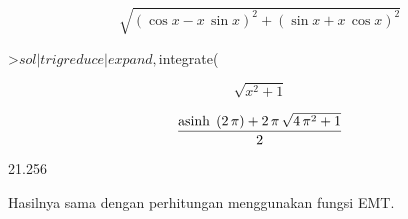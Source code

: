 \documentclass[a4paper,10pt]{article}
\begin{document}
\begin{eulernotebook}
\begin{eulercomment}
\begin{eulercomment}
\begin{eulercomment}
\begin{eulercomment}
\begin{eulercomment}
\begin{eulercomment}
\begin{eulercomment}
\begin{eulercomment}
\begin{eulercomment}
\begin{eulercomment}
\begin{eulercomment}
\begin{eulercomment}
\begin{eulercomment}
\begin{eulercomment}
\begin{euleroutput}
\end{euleroutput}
\begin{eulerformula}
\[
\sqrt{\left(\cos x-x\,\sin x\right)^2+\left(\sin x+x\,\cos x\right)
 ^2}
\]
\end{eulerformula}
\begin{eulerprompt}
>$sol | trigreduce | expand, $integrate(%
\end{eulerprompt}
\begin{eulerformula}
\[
\sqrt{x^2+1}
\]
\end{eulerformula}
\begin{eulerformula}
\[
\frac{{\rm asinh}\; \left(2\,\pi\right)+2\,\pi\,\sqrt{4\,\pi^2+1}}{
 2}
\]
\end{eulerformula}
\begin{euleroutput}
  21.256
\end{euleroutput}
\begin{eulercomment}
Hasilnya sama dengan perhitungan menggunakan fungsi EMT.


\end{eulercomment}
\end{eulercomment}
\end{eulercomment}
\end{eulercomment}
\end{eulercomment}
\end{eulercomment}
\end{eulercomment}
\end{eulercomment}
\end{eulercomment}
\end{eulercomment}
\end{eulercomment}
\end{eulercomment}
\end{eulercomment}
\end{eulercomment}
\end{eulercomment}
\end{eulernotebook}
\end{document}
